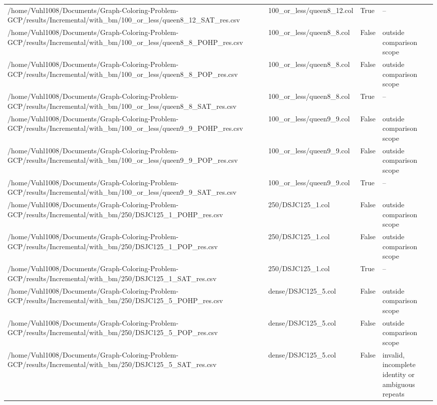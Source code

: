 \begin{table}[htbp]
\begin{tabular}{llll}
/home/Vuhl1008/Documents/Graph-Coloring-Problem-GCP/results/Incremental/with\_bm/100\_or\_less/queen8\_12\_SAT\_res.csv & 100\_or\_less/queen8\_12.col & True & -- \\
/home/Vuhl1008/Documents/Graph-Coloring-Problem-GCP/results/Incremental/with\_bm/100\_or\_less/queen8\_8\_POHP\_res.csv & 100\_or\_less/queen8\_8.col & False & outside comparison scope \\
/home/Vuhl1008/Documents/Graph-Coloring-Problem-GCP/results/Incremental/with\_bm/100\_or\_less/queen8\_8\_POP\_res.csv & 100\_or\_less/queen8\_8.col & False & outside comparison scope \\
/home/Vuhl1008/Documents/Graph-Coloring-Problem-GCP/results/Incremental/with\_bm/100\_or\_less/queen8\_8\_SAT\_res.csv & 100\_or\_less/queen8\_8.col & True & -- \\
/home/Vuhl1008/Documents/Graph-Coloring-Problem-GCP/results/Incremental/with\_bm/100\_or\_less/queen9\_9\_POHP\_res.csv & 100\_or\_less/queen9\_9.col & False & outside comparison scope \\
/home/Vuhl1008/Documents/Graph-Coloring-Problem-GCP/results/Incremental/with\_bm/100\_or\_less/queen9\_9\_POP\_res.csv & 100\_or\_less/queen9\_9.col & False & outside comparison scope \\
/home/Vuhl1008/Documents/Graph-Coloring-Problem-GCP/results/Incremental/with\_bm/100\_or\_less/queen9\_9\_SAT\_res.csv & 100\_or\_less/queen9\_9.col & True & -- \\
/home/Vuhl1008/Documents/Graph-Coloring-Problem-GCP/results/Incremental/with\_bm/250/DSJC125\_1\_POHP\_res.csv & 250/DSJC125\_1.col & False & outside comparison scope \\
/home/Vuhl1008/Documents/Graph-Coloring-Problem-GCP/results/Incremental/with\_bm/250/DSJC125\_1\_POP\_res.csv & 250/DSJC125\_1.col & False & outside comparison scope \\
/home/Vuhl1008/Documents/Graph-Coloring-Problem-GCP/results/Incremental/with\_bm/250/DSJC125\_1\_SAT\_res.csv & 250/DSJC125\_1.col & True & -- \\
/home/Vuhl1008/Documents/Graph-Coloring-Problem-GCP/results/Incremental/with\_bm/250/DSJC125\_5\_POHP\_res.csv & dense/DSJC125\_5.col & False & outside comparison scope \\
/home/Vuhl1008/Documents/Graph-Coloring-Problem-GCP/results/Incremental/with\_bm/250/DSJC125\_5\_POP\_res.csv & dense/DSJC125\_5.col & False & outside comparison scope \\
/home/Vuhl1008/Documents/Graph-Coloring-Problem-GCP/results/Incremental/with\_bm/250/DSJC125\_5\_SAT\_res.csv & dense/DSJC125\_5.col & False & invalid, incomplete identity or ambiguous repeats \\

\end{tabular}
\end{table}
